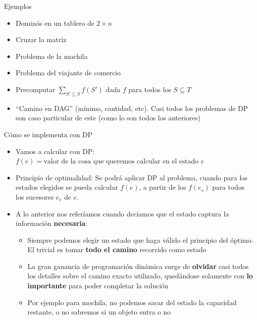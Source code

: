 \documentclass{beamer}
\begin{document}
\begin{frame}{Ejemplos}
	\begin{itemize}
		\item Dominós en un tablero de $2 \times n$
		\item Cruzar la matriz
		\item Problema de la mochila
        \item Problema del viajante de comercio
        \item Precomputar $\sum_{S' \subseteq S}{f(S')}$ dada $f$ para todos los $S \subseteq T$
		\item ``Camino en DAG'' (mínimo, cantidad, etc). Casi todos los problemas de DP son caso particular de este (como lo son todos los anteriores)
	\end{itemize}
\end{frame}

\begin{frame}{Cómo se implementa con DP}
	\begin{itemize}
		\item Vamos a calcular con DP: $f(e) = \mbox{valor de la cosa que queremos calcular en el estado $e$}$
		\item Principio de optimalidad: Se podrá aplicar DP al problema, cuando para los estados elegidos se pueda calcular $f(e)$, a partir de los
		     $f(e_s)$ para todos los sucesores $e_s$ de $e$.
		\item A lo anterior nos referíamos cuando decíamos que el estado captura la información \textbf{necesaria}:
		   \begin{itemize}
			  \item Siempre podemos elegir un estado que haga válido el principio del óptimo. El trivial es tomar \textbf{todo el camino} recorrido como estado
			  \item La gran ganancia de programación dinámica surge de \textbf{olvidar} casi todos los detalles sobre el camino exacto utilizado, quedándose solamente con \textbf{lo importante} para poder completar la solución
			  \item Por ejemplo para mochila, no podemos sacar del estado la capacidad restante, o no sabremos si un objeto entra o no
		   \end{itemize}
	\end{itemize}
\end{frame}
\end{document}
